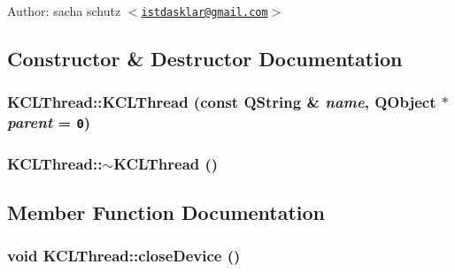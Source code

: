\begin{Desc}
\item[Author:]sacha schutz $<$\href{mailto:istdasklar@gmail.com}{\tt istdasklar@gmail.com}$>$ \end{Desc}


\subsection{Constructor \& Destructor Documentation}
\hypertarget{class_k_c_l_thread_233c3ccb8211c3c247acc7afa3d13381}{
\subsubsection[{KCLThread}]{\setlength{\rightskip}{0pt plus 5cm}KCLThread::KCLThread (const QString \& {\em name}, \/  QObject $\ast$ {\em parent} = {\tt 0})}}
\label{class_k_c_l_thread_233c3ccb8211c3c247acc7afa3d13381}


\hypertarget{class_k_c_l_thread_346cf94ab107d40c2b39d41ff5de6f89}{
\subsubsection[{$\sim$KCLThread}]{\setlength{\rightskip}{0pt plus 5cm}KCLThread::$\sim$KCLThread ()}}
\label{class_k_c_l_thread_346cf94ab107d40c2b39d41ff5de6f89}




\subsection{Member Function Documentation}
\hypertarget{class_k_c_l_thread_dc58b5a20a35371ecf539c51098411c6}{
\subsubsection[{closeDevice}]{\setlength{\rightskip}{0pt plus 5cm}void KCLThread::closeDevice ()}}
\label{class_k_c_l_thread_dc58b5a20a35371ecf539c51098411c6}


